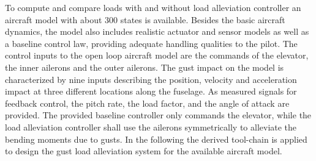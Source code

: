 \documentclass[graybox]{svmult}
\begin{document}
To  compute and compare loads with  and without load alleviation controller an aircraft model with about 300 states  is available. Besides the basic aircraft dynamics, the model also includes realistic actuator and sensor models as well as a baseline control law, providing adequate handling qualities to the pilot.
The control inputs to the open loop aircraft model are the  commands of the elevator, the inner ailerons and the outer ailerons. 
The gust impact on the model is characterized by  nine inputs describing the position, velocity and acceleration impact at three different locations along the fuselage.
As measured signals for feedback control, the pitch rate, the load factor,  and the angle of attack are provided.
The provided baseline controller only commands the elevator, while  the load alleviation controller shall use the ailerons symmetrically to alleviate the bending moments due to gusts.
In the following the derived tool-chain is applied to design the gust load alleviation system for the available aircraft model.\vspace{-1mm}

\end{document}
